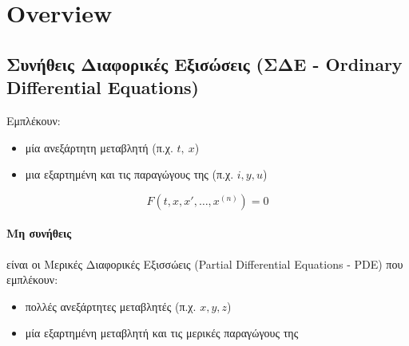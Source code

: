 \documentclass[11pt,a4paper,titlepage,draft]{article}
\begin{document}
\section{\textlatin{Overview}}

\subsection{Συνήθεις Διαφορικές Εξισώσεις (ΣΔΕ - \textlatin{Ordinary Differential Equations})}

\begin{defn}{}{}
Εμπλέκουν:
\begin{itemize}
\item μία ανεξάρτητη μεταβλητή (π.χ. \(t,\ x\))
\item μια εξαρτημένη και τις παραγώγους της (π.χ. \(i,y,u\))
\end{itemize}
\[
F(t,x,x',\dots,x^{(n)}) = 0
\]
\end{defn}{}{}

\paragraph{Μη συνήθεις}
είναι οι Μερικές Διαφορικές Εξισσώεις \textlatin{(Partial Differential Equations - PDE)} που εμπλέκουν:
\begin{itemize}
\item πολλές ανεξάρτητες μεταβλητές (π.χ. \(x,y,z\))
\item μία εξαρτημένη μεταβλητή και τις μερικές παραγώγους της
\end{itemize}
\end{document}
